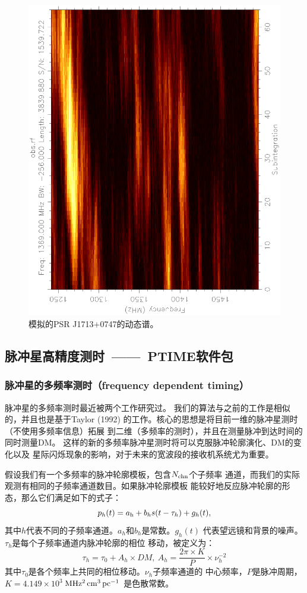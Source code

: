 \begin{figure}
\begin{center}
\includegraphics[width=3.5 in,angle=-90]{obsDyn.ps}
\end{center}
\caption{模拟的PSR J1713$+$0747的动态谱。}
\label{obs2}
\end{figure}

\subsection{脉冲星高精度测时\ ——\ PTIME软件包}

\subsubsection{脉冲星的多频率测时（frequency dependent timing）}

脉冲星的多频率测时最近被两个工作研究过\supercite{Pennucci14,Liu14}。
我们的算法与之前的工作是相似的，并且也是基于Taylor (1992)\supercite{Taylor92}
的工作。核心的思想是将目前一维的脉冲星测时（不使用多频率信息）拓展
到二维（多频率的测时），并且在测量脉冲到达时间的同时测量DM。
这样的新的多频率脉冲星测时将可以克服脉冲轮廓演化、DM的变化以及
星际闪烁现象的影响，对于未来的宽波段的接收机系统尤为重要。

假设我们有一个多频率的脉冲轮廓模板，包含$N_{\rm{chn}}$个子频率
通道，而我们的实际观测有相同的子频率通道数目。如果脉冲轮廓模板
能较好地反应脉冲轮廓的形态，那么它们满足如下的式子：
%
\begin{equation}
p_{h}(t)=a_{\rm{h}}+b_{h}s(t-\tau_{h})+g_{h}(t),
\end{equation}
%
其中$h$代表不同的子频率通道。$a_{h}$和$b_{h}$是常数。$g_{h}(t)$
代表望远镜和背景的噪声。$\tau_{h}$是每个子频率通道内脉冲轮廓的相位
移动，被定义为：
%
\begin{equation}
\tau_{h}=\tau_{0}+A_{h}\times DM,\ A_{h}=\frac{2\pi\times K}{P}\times\nu_{h}^{-2}
\end{equation}
%
其中$\tau_{0}$是各个频率上共同的相位移动。$\nu_{h}$子频率通道的
中心频率，$P$是脉冲周期，$K=4.149\times 10^{3}$\,$\rm{MHz^{2}\,cm^{3}\,pc^{-1}}$ 
是色散常数。

